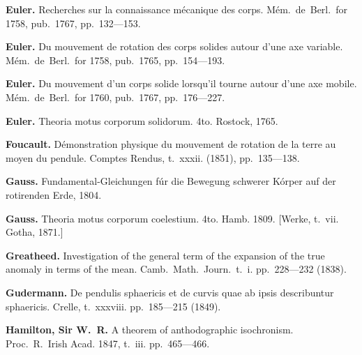 \documentclass[11pt,a4paper]{book}
\begin{document}
\vspace{0.5em}

\noindent\textbf{Euler.} Recherches sur la connaissance m\'{e}canique des corps. M\'{e}m.~de~Berl.~for 1758, pub.~1767, pp.~132---153.

\vspace{0.5em}

\noindent\textbf{Euler.} Du mouvement de rotation des corps solides autour d'une axe variable. M\'{e}m.~de~Berl.~for 1758, pub.~1765, pp.~154---193.

\vspace{0.5em}

\noindent\textbf{Euler.} Du mouvement d'un corps solide lorsqu'il tourne autour d'une axe mobile. M\'{e}m.~de~Berl.~for 1760, pub.~1767, pp.~176---227.

\vspace{0.5em}

\noindent\textbf{Euler.} Theoria motus corporum solidorum. 4to. Rostock, 1765.

\vspace{0.5em}

\noindent\textbf{Foucault.} D\'{e}monstration physique du mouvement de rotation de la terre au moyen du pendule. Comptes Rendus, t.~xxxii. (1851), pp.~135---138.

\vspace{0.5em}

\noindent\textbf{Gauss.} Fundamental-Gleichungen f\'{u}r die Bewegung schwerer K\'{o}rper auf der rotirenden Erde, 1804.

\vspace{0.5em}

\noindent\textbf{Gauss.} Theoria motus corporum coelestium. 4to. Hamb. 1809. [Werke, t.~vii. Gotha, 1871.]

\vspace{0.5em}

\noindent\textbf{Greatheed.} Investigation of the general term of the expansion of the true anomaly in terms of the mean. Camb.~Math.~Journ.~t.~i. pp.~228---232 (1838).

\vspace{0.5em}

\noindent\textbf{Gudermann.} De pendulis sphaericis et de curvis quae ab ipsis describuntur sphaericis. Crelle, t.~xxxviii. pp.~185---215 (1849).

\vspace{0.5em}

\noindent\textbf{Hamilton, Sir W.~R.} A theorem of anthodographic isochronism. Proc.~R.~Irish Acad. 1847, t.~iii. pp.~465---466.
\end{document}

